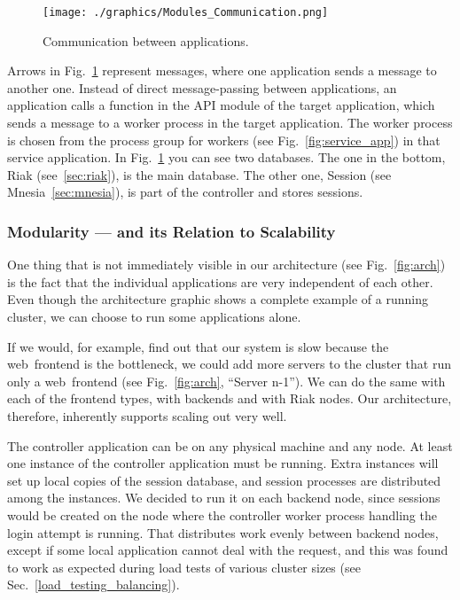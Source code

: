 \documentclass[11pt,a4paper]{report}
\begin{document}
\begin{figure}[h]
 \centering
 \texttt{[image: ./graphics/Modules\_Communication.png]}
 \caption{Communication between applications.}
 \label{fig:mod_conn}
\end{figure}

Arrows in Fig.~\ref{fig:mod_conn} represent messages, where one application
sends a message to another one. Instead of direct message-passing between
applications, an application calls a function in the API module of the target
application, which sends a message to a worker process in the target application.
The worker process is chosen from the process group for workers
(see Fig.~\ref{fig:service_app}) in that service application. In
Fig.~\ref{fig:mod_conn} you can see two databases. The one in the bottom, Riak
(see~\ref{sec:riak}), is the main database. The other one, Session
(see Mnesia~\ref{sec:mnesia}), is part of the controller and stores sessions.

\subsubsection{Modularity --- and its Relation to Scalability}
One thing that is not immediately visible in our architecture (see Fig.~\ref{fig:arch})
is the fact that the individual applications are very independent of each other. Even
though the architecture graphic shows a complete example of a running cluster,
we can choose to run some applications alone.

If we would, for example, find out that our system is slow because the
web~frontend is the bottleneck, we could add more servers to the cluster that
run only a web~frontend (see Fig.~\ref{fig:arch}, ``Server n-1'').
We can do the same with each of the frontend types, with backends and with Riak nodes.
Our architecture, therefore, inherently supports scaling out very well.

The controller application can be on any physical machine and any node. At least
one instance of the controller application must be running. Extra instances will
set up local copies of the session database, and session processes are distributed
among the instances. We decided to run it on each backend node, since sessions
would be created on the node where the controller worker process handling the
login attempt is running. That distributes work evenly between backend nodes,
except if some local application cannot deal with the request, and this was
found to work as expected during load tests of various cluster sizes
(see Sec.~\ref{load_testing_balancing}).
\end{document}
